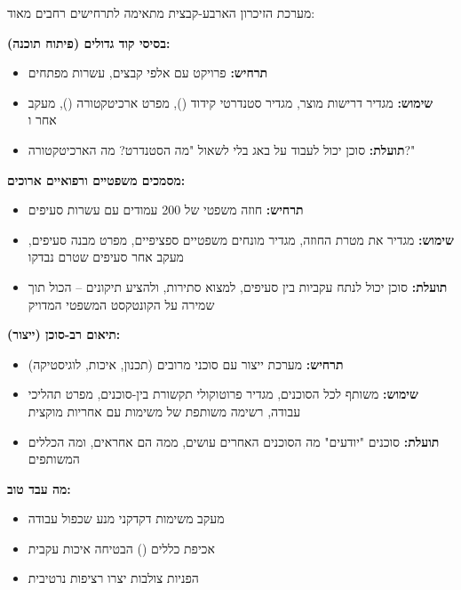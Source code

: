 
מערכת הזיכרון הארבע-קבצית מתאימה לתרחישים רחבים מאוד:

\textbf{בסיסי קוד גדולים (פיתוח תוכנה):}
\begin{itemize}
  \item \textbf{תרחיש:} פרויקט  עם אלפי קבצים, עשרות מפתחים
  \item \textbf{שימוש:}  מגדיר דרישות מוצר,  מגדיר סטנדרטי קידוד (),  מפרט ארכיטקטורה (),  מעקב אחר  ו
  \item \textbf{תועלת:} סוכן  יכול לעבוד על באג בלי לשאול "מה הסטנדרט? מה הארכיטקטורה?"
\end{itemize}

\textbf{מסמכים משפטיים ורפואיים ארוכים:}
\begin{itemize}
  \item \textbf{תרחיש:} חוזה משפטי של \num{200} עמודים עם עשרות סעיפים
  \item \textbf{שימוש:}  מגדיר את מטרת החוזה,  מגדיר מונחים משפטיים ספציפיים,  מפרט מבנה סעיפים,  מעקב אחר סעיפים שטרם נבדקו
  \item \textbf{תועלת:} סוכן יכול לנתח עקביות בין סעיפים, למצוא סתירות, ולהציע תיקונים – הכול תוך שמירה על הקונטקסט המשפטי המדויק
\end{itemize}

\textbf{תיאום רב-סוכן (ייצור):}
\begin{itemize}
  \item \textbf{תרחיש:} מערכת ייצור עם סוכני  מרובים (תכנון, איכות, לוגיסטיקה)
  \item \textbf{שימוש:}  משותף לכל הסוכנים,  מגדיר פרוטוקולי תקשורת בין-סוכנים,  מפרט תהליכי עבודה,  רשימה משותפת של משימות עם אחריות מוקצית
  \item \textbf{תועלת:} סוכנים "יודעים" מה הסוכנים האחרים עושים, ממה הם אחראים, ומה הכללים המשותפים
\end{itemize}


\textbf{מה עבד טוב:}
\begin{itemize}
  \item מעקב משימות דקדקני מנע שכפול עבודה
  \item אכיפת כללים () הבטיחה איכות עקבית
  \item הפניות צולבות יצרו רציפות נרטיבית
\end{itemize}

